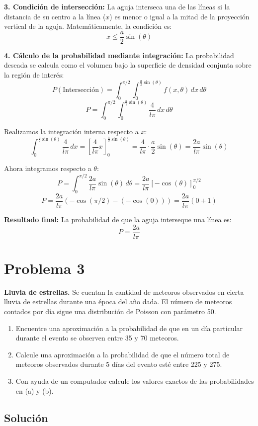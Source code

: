 \documentclass[a4paper]{article}
\begin{document}
\textbf{3. Condición de intersección:}
La aguja interseca una de las líneas si la distancia de su centro a la línea ($x$) es menor o igual a la mitad de la proyección vertical de la aguja. Matemáticamente, la condición es:
$$x \le \frac{a}{2} \sin(\theta)$$

\textbf{4. Cálculo de la probabilidad mediante integración:}
La probabilidad deseada se calcula como el volumen bajo la superficie de densidad conjunta sobre la región de interés:
$$P(\text{Intersección}) = \int_{0}^{\pi/2} \int_{0}^{\frac{a}{2} \sin(\theta)} f(x, \theta) \, dx \, d\theta$$
$$P = \int_{0}^{\pi/2} \int_{0}^{\frac{a}{2} \sin(\theta)} \frac{4}{l\pi} \, dx \, d\theta$$

Realizamos la integración interna respecto a $x$:
$$\int_{0}^{\frac{a}{2} \sin(\theta)} \frac{4}{l\pi} \, dx = \left[ \frac{4}{l\pi} x \right]_{0}^{\frac{a}{2} \sin(\theta)} = \frac{4}{l\pi} \cdot \frac{a}{2} \sin(\theta) = \frac{2a}{l\pi} \sin(\theta)$$

Ahora integramos respecto a $\theta$:
$$P = \int_{0}^{\pi/2} \frac{2a}{l\pi} \sin(\theta) \, d\theta = \frac{2a}{l\pi} \left[ -\cos(\theta) \right]_{0}^{\pi/2}$$
$$P = \frac{2a}{l\pi} \left( -\cos(\pi/2) - (-\cos(0)) \right) = \frac{2a}{l\pi} (0 + 1)$$

\textbf{Resultado final:}
La probabilidad de que la aguja interseque una línea es:
$$P = \frac{2a}{l\pi}$$

\section{Problema 3}
\textbf{Lluvia de estrellas.} Se cuentan la cantidad de meteoros observados en cierta lluvia de estrellas durante una época del año dada. El número de meteoros contados por día sigue una distribución de Poisson con parámetro 50.

\begin{enumerate}
    \item[(a)] Encuentre una aproximación a la probabilidad de que en un día particular durante el evento se observen entre 35 y 70 meteoros.
    \item[(b)] Calcule una aproximación a la probabilidad de que el número total de meteoros observados durante 5 días del evento esté entre 225 y 275.
    \item[(c)] Con ayuda de un computador calcule los valores exactos de las probabilidades en (a) y (b).
\end{enumerate}

\subsection{Solución}
\end{document}
